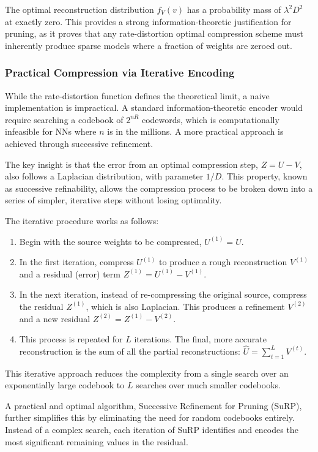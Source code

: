 The optimal reconstruction distribution $f_V(v)$ has a probability mass of $\lambda^2D^2$ at exactly zero. This provides a strong information-theoretic justification for pruning, as it proves that any rate-distortion optimal compression scheme must inherently produce sparse models where a fraction of weights are zeroed out.

\subsubsection*{Practical Compression via Iterative Encoding}
\label{sec:practical-encoding}

While the rate-distortion function defines the theoretical limit, a naive implementation is impractical. A standard information-theoretic encoder would require searching a codebook of $2^{nR}$ codewords, which is computationally infeasible for NNs where $n$ is in the millions. A more practical approach is achieved through successive refinement.

The key insight is that the error from an optimal compression step, $Z = U - V$, also follows a Laplacian distribution, with parameter $1/D$. This property, known as successive refinability, allows the compression process to be broken down into a series of simpler, iterative steps without losing optimality.

The iterative procedure works as follows:
\begin{enumerate}
    \item Begin with the source weights to be compressed, $U^{(1)} = U$.
    \item In the first iteration, compress $U^{(1)}$ to produce a rough reconstruction $V^{(1)}$ and a residual (error) term $Z^{(1)} = U^{(1)} - V^{(1)}$.
    \item In the next iteration, instead of re-compressing the original source, compress the residual $Z^{(1)}$, which is also Laplacian. This produces a refinement $V^{(2)}$ and a new residual $Z^{(2)} = Z^{(1)} - V^{(2)}$.
    \item This process is repeated for $L$ iterations. The final, more accurate reconstruction is the sum of all the partial reconstructions: $\hat{U} = \sum_{t=1}^{L} V^{(t)}$.
\end{enumerate}

This iterative approach reduces the complexity from a single search over an exponentially large codebook to $L$ searches over much smaller codebooks.

A practical and optimal algorithm, Successive Refinement for Pruning (SuRP), further simplifies this by eliminating the need for random codebooks entirely. Instead of a complex search, each iteration of SuRP identifies and encodes the most significant remaining values in the residual.

